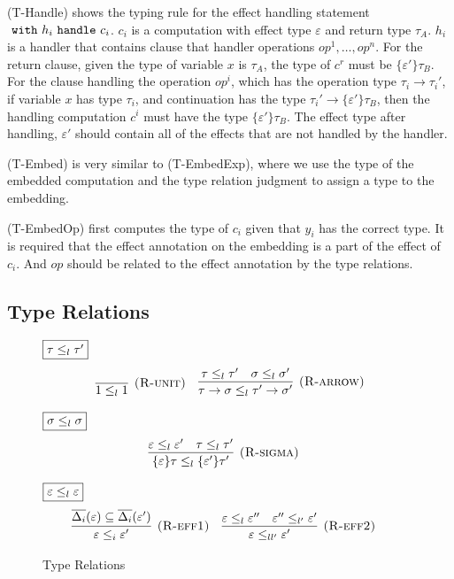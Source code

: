(T-Handle) shows the typing rule for the effect handling statement $\ \texttt{with}\  h_i \ \texttt{handle}\  c_i$. $c_i$ is a computation with effect type $\varepsilon$ and return type $\tau_A$. $h_i$ is a handler that contains clause that handler operations $op^1 , \dots ,op^n$. For the return clause, given the type of variable $x$ is $\tau_A$, the type of $c^r$ must be $\{\varepsilon'\}\tau_B$. For the clause handling the operation $op^i$, which has the operation type $\tau_i \rightarrow \tau_i'$,  if variable $x$ has type $\tau_i$, and continuation has the type $\tau_i' \rightarrow \{\varepsilon'\}\tau_B$, then the handling computation $c^i$ must have the type $\{\varepsilon'\}\tau_B$. The effect type after handling, $\varepsilon'$ should contain all of the effects that are not handled by the handler.

(T-Embed) is very similar to (T-EmbedExp), where we use the type of the embedded computation and the type relation judgment to assign a type to the embedding. 

(T-EmbedOp) first computes the type of $c_i$ given that $y_i$ has the correct type. It is required that the effect annotation on the embedding is a part of the effect of $c_i$. And $op$ should be related to the effect annotation by the type relations.

\subsection{Type Relations}
\begin{figure}[H]
\footnotesize{
\noindent$\fbox{$\tau \leq_l \tau'$}$
\[
\begin{array}{c}

\infer[\textsc{(R-unit)}]
	{1 \leq_l 1}
	{} \quad

\infer[\textsc{(R-arrow)}]
	{\tau \rightarrow \sigma \leq_l \tau' \rightarrow \sigma'}
	{\tau \leq_l \tau' & \sigma \leq_l \sigma'}
  
\end{array} \\[3ex]
\]

\noindent$\fbox{$\sigma \leq_l \sigma$}$
\[
\begin{array}{c}

\infer[\textsc{(R-sigma)}]
	{\{\varepsilon\}\tau \leq_l \{\varepsilon'\}\tau'}
	{ \varepsilon \leq_l \varepsilon' & \tau \leq_l \tau' } \quad
  
\end{array} \\[3ex]
\]

\noindent$\fbox{$\varepsilon \leq_l \varepsilon$}$
\[
\begin{array}{c}

\infer[\textsc{(R-eff1)}]
	{\varepsilon \leq_i \varepsilon'}
	{ \overline{\Delta_i}(\varepsilon) \subseteq \overline{\Delta_i}(\varepsilon')  } \quad

\infer[\textsc{(R-eff2)}]
	{\varepsilon \leq_{ll'} \varepsilon'}
	{  \varepsilon \leq_l \varepsilon'' &   \varepsilon'' \leq_{l'} \varepsilon' } \quad
\end{array} \\[3ex]
\]
}

\caption{Type Relations}
\label{fig-relation}
\end{figure}

